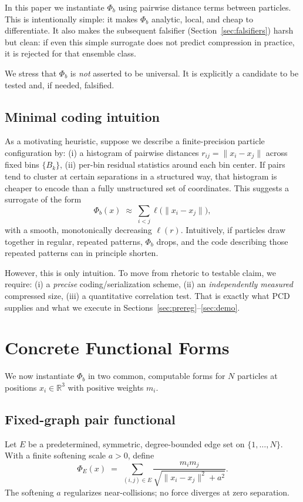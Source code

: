 \documentclass[11pt]{article}
\begin{document}
In this paper we instantiate $\Phi_b$ using pairwise distance terms between particles.
This is intentionally simple: it makes $\Phi_b$ analytic, local, and cheap to differentiate.
It also makes the subsequent falsifier (Section~\ref{sec:falsifiers}) harsh but clean:
if even this simple surrogate does not predict compression in practice, it is rejected for that ensemble class.

We stress that $\Phi_b$ is \emph{not} asserted to be universal.
It is explicitly a candidate to be tested and, if needed, falsified.

\subsection{Minimal coding intuition}
As a motivating heuristic, suppose we describe a finite-precision particle configuration by:
(i) a histogram of pairwise distances $r_{ij} = \|x_i-x_j\|$ across fixed bins $\{B_k\}$,
(ii) per-bin residual statistics around each bin center.
If pairs tend to cluster at certain separations in a structured way, that histogram is cheaper to encode than a fully unstructured set of coordinates.
This suggests a surrogate of the form
\begin{equation}
    \Phi_b(x) \;\approx\; \sum_{i<j} \ell\big(\|x_i-x_j\|\big),
\end{equation}
with a smooth, monotonically decreasing $\ell(r)$.
Intuitively, if particles draw together in regular, repeated patterns, $\Phi_b$ drops, and the code describing those repeated patterns can in principle shorten.

However, this is only intuition.
To move from rhetoric to testable claim, we require:
(i) a \emph{precise} coding/serialization scheme,
(ii) an \emph{independently measured} compressed size,
(iii) a quantitative correlation test.
That is exactly what PCD supplies and what we execute in Sections~\ref{sec:prereg}--\ref{sec:demo}.

\section{Concrete Functional Forms}
We now instantiate $\Phi_b$ in two common, computable forms for $N$ particles at positions $x_i\in\mathbb{R}^3$ with positive weights $m_i$.

\subsection{Fixed-graph pair functional}
Let $E$ be a predetermined, symmetric, degree-bounded edge set on $\{1,\dots,N\}$.
With a finite softening scale $a>0$, define
\begin{equation}
    \Phi_E(x)
    \;=\;
    \sum_{(i,j)\in E} 
    \frac{m_i m_j}
         {\sqrt{\|x_i - x_j\|^2 + a^2}}.
    \label{eq:phiE}
\end{equation}
The softening $a$ regularizes near-collisions; no force diverges at zero separation.
\end{document}
